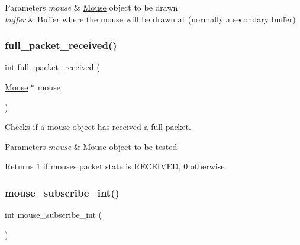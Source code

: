 \begin{DoxyParams}{Parameters}
{\em mouse} & \hyperlink{struct_mouse}{Mouse} \textquotesingle{}object\textquotesingle{} to be drawn \\
\hline
{\em buffer} & Buffer where the mouse will be drawn at (normally a secondary buffer) \\
\hline
\end{DoxyParams}
\hypertarget{group__mouse_gae1e0937813a3d320ad6325616bd2b09e}{}\label{group__mouse_gae1e0937813a3d320ad6325616bd2b09e} 
\subsubsection{\texorpdfstring{full\+\_\+packet\+\_\+received()}{full\_packet\_received()}}
{\footnotesize\ttfamily int full\+\_\+packet\+\_\+received (\begin{DoxyParamCaption}\item[{\hyperlink{struct_mouse}{Mouse} $\ast$}]{mouse }\end{DoxyParamCaption})}



Checks if a mouse \textquotesingle{}object\textquotesingle{} has received a full packet. 


\begin{DoxyParams}{Parameters}
{\em mouse} & \hyperlink{struct_mouse}{Mouse} \textquotesingle{}object\textquotesingle{} to be tested \\
\hline
\end{DoxyParams}
\begin{DoxyReturn}{Returns}
1 if mouse\textquotesingle{}s packet state is R\+E\+C\+E\+I\+V\+ED, 0 otherwise 
\end{DoxyReturn}
\hypertarget{group__mouse_ga99506573209b197b84ee22a228b89fbd}{}\label{group__mouse_ga99506573209b197b84ee22a228b89fbd} 
\subsubsection{\texorpdfstring{mouse\+\_\+subscribe\+\_\+int()}{mouse\_subscribe\_int()}}
{\footnotesize\ttfamily int mouse\+\_\+subscribe\+\_\+int (\begin{DoxyParamCaption}{ }\end{DoxyParamCaption})}



